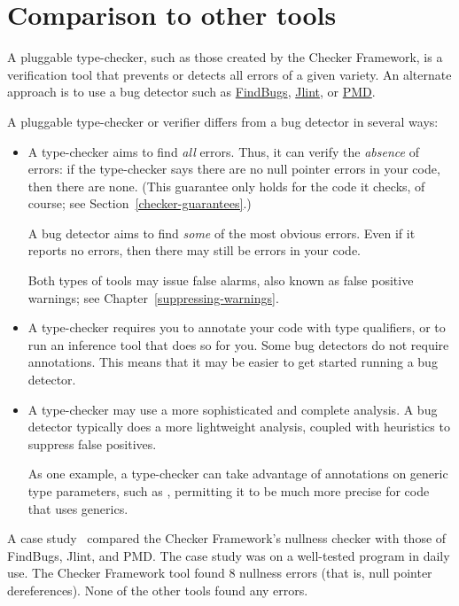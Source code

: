 \section{Comparison to other tools\label{other-tools}}

A pluggable type-checker, such as those created by the Checker Framework,
is a verification tool that prevents or detects all errors of a given variety.  An
alternate approach is to use a bug detector such as
\href{http://findbugs.sourceforge.net/}{FindBugs},
\href{http://jlint.sourceforge.net/}{Jlint}, or
\href{http://pmd.sourceforge.net/}{PMD}.

A pluggable type-checker or verifier
differs from a bug detector in several ways:
\begin{itemize}
\item
  A type-checker aims to find \emph{all} errors.  Thus, it can verify the
  \emph{absence} of errors:  if the type-checker says there are no null
  pointer errors in your code, then there are none.  (This guarantee only
  holds for the code it checks, of course; see
  Section~\ref{checker-guarantees}.)

  A bug detector aims to find \emph{some} of the most obvious errors.  Even
  if it reports no errors, then there may still be errors in your code.

  Both types of tools may issue false alarms,
  also known as false positive warnings;
  see Chapter~\ref{suppressing-warnings}.

\item
  A type-checker requires you to annotate your code with type qualifiers,
  or to run an inference tool that does so for you.  Some bug detectors do not
  require annotations.  This means that it may be easier to get started
  running a bug detector.

\item
  A type-checker may use a more sophisticated and complete analysis.
  A bug detector typically does a more lightweight analysis, coupled with
  heuristics to suppress false positives.

  As one example, a type-checker can take advantage of annotations on
  generic type parameters, such as , permitting
  it to be much more precise for code that uses generics.

\end{itemize}

A case study~\cite[\S6]{PapiACPE2008} compared the Checker Framework's nullness
checker with those of FindBugs, Jlint, and PMD\@.  The case study was on a
well-tested program in daily use.  The Checker Framework tool found 8
nullness errors (that is, null pointer dereferences).  None of the other
tools found any errors.

